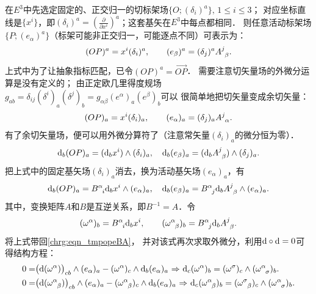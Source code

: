 在$E^3$中先选定固定的、正交归一的切标架场$\{O;(\delta_i)^a\},\, 1\leqslant i \leqslant 3$；
对应坐标直线是$\{x^i\}$，即$(\delta_i)^a= (\frac{\partial}{\partial x^i})^a$；这套基矢在$E^3$中每点都相同．
则任意活动标架场$\{P;(e_\alpha)^a\}$（标架可能非正交归一，可能逐点不同）可表示为：
\begin{equation}
    (OP)^a = x^i (\delta_i)^a,\qquad
    (e_\beta)^a = (\delta_j)^a A^j_{\hphantom{j} \beta} .
\end{equation}
上式中为了让抽象指标匹配，已令$(OP)^a=\overrightarrow{OP}$．
需要注意切矢量场的外微分运算是没有定义的；
由正定欧几里得度规场$g_{ab}=\delta_{ij}(\delta^i)_a (\delta^j)_b
=g_{\alpha\beta}(e^\alpha)_a(e^\beta)_b$可以
很简单地把切矢量变成余切矢量：
\begin{equation}
    (OP)_a = x^i (\delta_i)_a,\qquad
    (e_\alpha)_a = (\delta_j)_a A^j_{\hphantom{j} \alpha} .
\end{equation}
有了余切矢量场，便可以用外微分算符了（注意常矢量$(\delta_i)_a$的微分恒为零）．
\begin{equation}
    {\rm d}_b (OP)_a = ({\rm d}_b x^i) \wedge (\delta_i)_a,\quad
    {\rm d}_b (e_\beta)_a = ({\rm d}_b A^j_{\hphantom{j} \beta}) \wedge  (\delta_j)_a .
\end{equation}
把上式中的固定基矢场$(\delta_i)_a$消去，换为活动基矢场$(e_\alpha)_a$，有
\begin{equation}\label{chrg:eqn_tmpopeBA}
    {\rm d}_b (OP)_a = B^{\alpha}_{\hphantom{\alpha} i} {\rm d}_b x^i \wedge (e_\alpha)_a  ,\quad
    {\rm d}_b (e_\beta)_a = B^{\alpha}_{\hphantom{\alpha} j}{\rm d}_b A^j_{\hphantom{j} \beta} \wedge  (e_\alpha)_a .
\end{equation}
其中，变换矩阵$A$和$B$是互逆关系，即$B^{-1} = A$．令
\begin{equation}\label{chrg:eqn_om324}
    (\omega^\alpha)_b = B^{\alpha}_{\hphantom{\alpha} i} {\rm d}_b x^i,\qquad
    (\omega^{\alpha}_{\hphantom{\alpha} \beta})_b=B^{\alpha}_{\hphantom{\alpha} j}
    {\rm d}_b A^j_{\hphantom{j} \beta} .
\end{equation}
将上式带回\eqref{chrg:eqn_tmpopeBA}，
并对该式再次求取外微分，利用${\rm d}\circ {\rm d}=0$可得结构方程：
\begin{align}
    0=&\bigl({\rm d} (\omega^\alpha)\bigr)_{cb} \wedge (e_\alpha)_a - (\omega^\alpha)_c \wedge {\rm d}_b(e_\alpha)_a
    {\ \Rightarrow \ }
    {\rm d}_c (\omega^\alpha)_b = (\omega^\sigma)_c\wedge (\omega_{\hphantom{\alpha} \sigma}^\alpha)_b . \label{chrg:eqn_jgfc1} \\
    0=&\bigl({\rm d} (\omega^\alpha_{\hphantom{\alpha} \beta})\bigr)_{cb} \wedge  (e_\alpha)_a 
    - (\omega^\alpha_{\hphantom{\alpha} \beta})_c \wedge {\rm d}_b (e_\alpha)_a {\ \Rightarrow \ }
    {\rm d}_c (\omega^\alpha_{\hphantom{\alpha} \beta})_b = (\omega^{\sigma}_{\hphantom{\alpha} \beta})_c 
    \wedge (\omega^{\alpha}_{\hphantom{\alpha} \sigma})_b .    \label{chrg:eqn_jgfc2}
\end{align}  %



